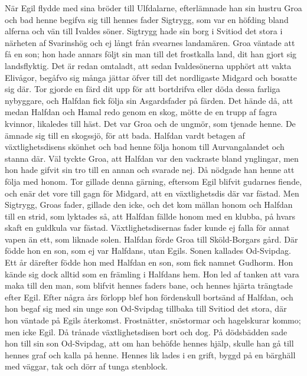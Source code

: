När Egil flydde med sina bröder till Ulfdalarne, efterlämnade han sin
hustru Groa och bad henne begifva sig till hennes fader Sigtrygg, som
var en höfding bland alferna och vän till Ivaldes söner. Sigtrygg hade
sin borg i Svitiod det stora i närheten af Svarinshög och ej långt från
svearnes landamären. Groa väntade att få en son; hon hade annars följt
sin man till det frostkalla land, dit han gjort sig landsflyktig. Det är
redan omtaladt, att sedan Ivaldesönerna upphört att vakta Elivågor,
begåfvo sig många jättar öfver till det nordligaste Midgard och bosatte
sig där. Tor gjorde en färd dit upp för att bortdrifva eller döda dessa
farliga nybyggare, och Halfdan fick följa sin Asgardsfader på färden.
Det hände då, att medan Halfdan och Hamal redo genom en skog, mötte de
en trupp af fagra kvinnor, likaledes till häst. Det var Groa och de
ungmör, som tjenade henne. De ämnade sig till en skogssjö, för att bada.
Halfdan vardt betagen af växtlighetsdisens skönhet och bad henne följa
honom till Aurvangalandet och stanna där. Väl tyckte Groa, att Halfdan
var den vackraste bland ynglingar, men hon hade gifvit sin tro till en
annan och svarade nej. Då nödgade han henne att följa med honom. Tor
gillade denna gärning, eftersom Egil blifvit gudarnes fiende, och enär
det vore till gagn för Midgard, att en växtlighetsdis där var fästad.
Men Sigtrygg, Groas fader, gillade den icke, och det kom mällan honom
och Halfdan till en strid, som lyktades så, att Halfdan fällde honom med
en klubba, på hvars skaft en guldkula var fästad. Växtlighetsdisernas
fader kunde ej falla för annat vapen än ett, som liknade solen. Halfdan
förde Groa till Sköld-Borgars gård.
\protect\hypertarget{lb1625905.xhtmlux5cux23start96}{}{}\protect\hypertarget{lb1625905.xhtmlux5cux23start96-a}{}{}\protect\hypertarget{lb1625905.xhtmlux5cux23start96-b}{}{}\protect\hypertarget{lb1625905.xhtmlux5cux23start96-c}{}{}\protect\hypertarget{lb1625905.xhtmlux5cux23start96-d}{}{}
Där födde hon en son, som ej var Halfdans, utan Egils. Sonen kallades
Od-Svipdag. Ett år därefter födde hon med Halfdan en son, som fick
namnet Gudhorm. Hon kände sig dock alltid som en främling i Halfdans
hem. Hon led af tanken att vara maka till den man, som blifvit hennes
faders bane, och hennes hjärta trängtade efter Egil. Efter några års
förlopp blef hon fördenskull bortsänd af Halfdan, och hon begaf sig med
sin unge son Od-Svipdag tillbaka till Svitiod det stora, där hon väntade
på Egils återkomst. Frostnätter, snöstormar och hagelskurar kommo; men
icke Egil. Då trånade växtlighetsdisen bort och dog. På dödsbädden sade
hon till sin son Od-Svipdag, att om han behöfde hennes hjälp, skulle han
gå till hennes graf och kalla på henne. Hennes lik lades i en grift,
byggd på en bärghäll med väggar, tak och dörr af tunga stenblock.


